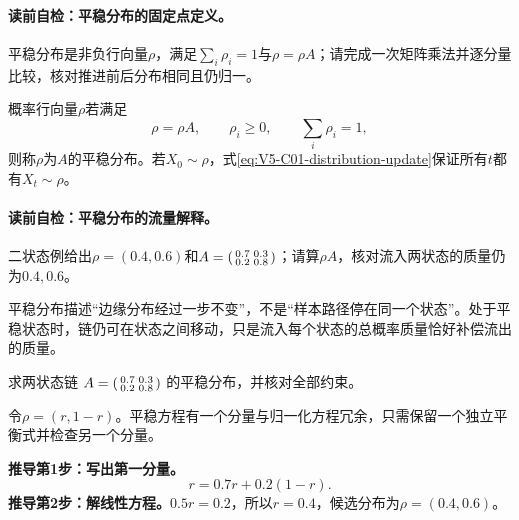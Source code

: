 \paragraph{读前自检：平稳分布的固定点定义。}平稳分布是非负行向量$\rho$，满足$\sum_i\rho_i=1$与$\rho=\rho A$；请完成一次矩阵乘法并逐分量比较，核对推进前后分布相同且仍归一。\par

\label{struct:V5-C01-CH11}
\begin{definition}[平稳分布]
概率行向量$\rho$若满足
\begin{equation}\label{eq:V5-C01-stationary}
\rho=\rho A,\qquad \rho_i\ge0,\qquad\sum_i\rho_i=1,
\end{equation}
则称$\rho$为$A$的平稳分布。若$X_0\sim\rho$，式\eqref{eq:V5-C01-distribution-update}保证所有$t$都有$X_t\sim\rho$。
\end{definition}

\paragraph{读前自检：平稳分布的流量解释。}二状态例给出$\rho=(0.4,0.6)$和$A=\begin{psmallmatrix}0.7&0.3\\0.2&0.8\end{psmallmatrix}$；请算$\rho A$，核对流入两状态的质量仍为$0.4,0.6$。\par

平稳分布描述“边缘分布经过一步不变”，不是“样本路径停在同一个状态”。处于平稳状态时，链仍可在状态之间移动，只是流入每个状态的总概率质量恰好补偿流出的质量。


\begin{derivationgoalbox}
求两状态链
$A=\begin{psmallmatrix}0.7&0.3\\0.2&0.8\end{psmallmatrix}$
的平稳分布，并核对全部约束。
\end{derivationgoalbox}
\begin{derivationprepbox}
令$\rho=(r,1-r)$。平稳方程有一个分量与归一化方程冗余，只需保留一个独立平衡式并检查另一个分量。
\end{derivationprepbox}
\textbf{推导第1步：写出第一分量。}
\[
r=0.7r+0.2(1-r).
\]
\textbf{推导第2步：解线性方程。}$0.5r=0.2$，所以$r=0.4$，候选分布为$\rho=(0.4,0.6)$。

